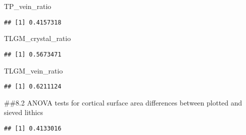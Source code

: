 \documentclass[
]{article}
\newenvironment{Shaded}{\begin{snugshade}}{\end{snugshade}}
\newcommand{\FunctionTok}[1]{\textcolor[rgb]{0.13,0.29,0.53}{\textbf{#1}}}
\newcommand{\NormalTok}[1]{#1}
\newcommand{\SpecialCharTok}[1]{\textcolor[rgb]{0.81,0.36,0.00}{\textbf{#1}}}
\begin{document}
\begin{Shaded}
\begin{Highlighting}[]
\NormalTok{TP\_vein\_ratio}
\end{Highlighting}
\end{Shaded}

\begin{verbatim}
## [1] 0.4157318
\end{verbatim}

\begin{Shaded}
\begin{Highlighting}[]
\NormalTok{TLGM\_crystal\_ratio}
\end{Highlighting}
\end{Shaded}

\begin{verbatim}
## [1] 0.5673471
\end{verbatim}

\begin{Shaded}
\begin{Highlighting}[]
\NormalTok{TLGM\_vein\_ratio}
\end{Highlighting}
\end{Shaded}

\begin{verbatim}
## [1] 0.6211124
\end{verbatim}

\#\#8.2 ANOVA tests for cortical surface area differences between
plotted and sieved lithics

\begin{Shaded}
\end{Shaded}

\begin{verbatim}
## [1] 0.4133016
\end{verbatim}

\begin{Shaded}
\end{Shaded}
\end{document}
